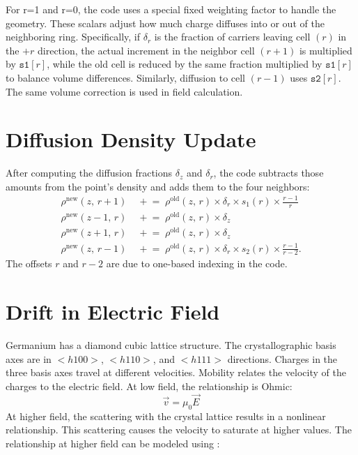 For r=1 and r=0, the code uses a special fixed weighting factor to handle the geometry. These scalars adjust how much charge diffuses into or out of the neighboring ring. Specifically, if $\delta_r$ is the fraction of carriers leaving cell $(r)$ in 
the $+r$ direction, the actual increment in the neighbor cell 
$(r+1)$ is multiplied by $\texttt{s1}[r]$, while the old cell is 
reduced by the same fraction multiplied by $\texttt{s1}[r]$ to 
balance volume differences. Similarly, diffusion to cell $(r-1)$ 
uses $\texttt{s2}[r]$. The same volume correction is used in field calculation.

\section{Diffusion Density Update}

After computing the diffusion fractions $\delta_z$ and $\delta_r$, the code subtracts those amounts from the point's density and adds them to the four neighbors:
\begin{align}
  \rho^{\mathrm{new}}(z,\,r+1) &\;\mathrel{+}= \;\rho^{\mathrm{old}}(z,\,r)\times\delta_r \times s_1(r) \times \frac{r-1}{r} \label{ch3:eq:diffusion_update_1} \\
  \rho^{\mathrm{new}}(z-1,\,r) &\;\mathrel{+}= \;\rho^{\mathrm{old}}(z,\,r)\times\delta_z \label{ch3:eq:diffusion_update_2} \\
  \rho^{\mathrm{new}}(z+1,\,r) &\;\mathrel{+}= \;\rho^{\mathrm{old}}(z,\,r)\times\delta_z \label{ch3:eq:diffusion_update_3} \\
  \rho^{\mathrm{new}}(z,\,r-1) &\;\mathrel{+}= \;\rho^{\mathrm{old}}(z,\,r) \times \delta_r \times s_2(r) \times\frac{r-1}{r-2} \label{ch3:eq:diffusion_update_4}.
\end{align}
 The offsets $r$ and $r-2$ are due to one-based indexing in the code.
 
\section{Drift in Electric Field}
Germanium has a diamond cubic lattice structure. The crystallographic basis axes are in $<h100>$, $<h110>$, and $<h111>$ directions. Charges in the three basis axes travel at different velocities. Mobility relates the velocity of the charges to the electric field. At low field, the relationship is Ohmic:
\begin{equation}
\vec{v} = \mu_0 \vec{E}
\end{equation}
At higher field, the scattering with the crystal lattice results in a nonlinear relationship. This scattering causes the velocity to saturate at higher values. The relationship at higher field can be modeled using \cite{Caughey_1448053}:

